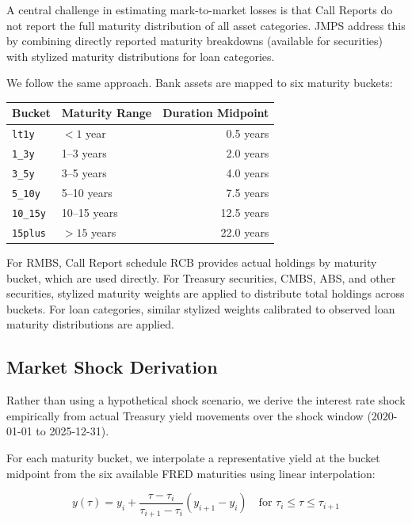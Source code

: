 \documentclass[12pt, a4paper]{article}
\begin{document}
A central challenge in estimating mark-to-market losses is that Call Reports do
not report the full maturity distribution of all asset categories. JMPS address
this by combining directly reported maturity breakdowns (available for securities)
with stylized maturity distributions for loan categories.

We follow the same approach. Bank assets are mapped to six maturity buckets:

\begin{center}
\begin{tabular}{llr}
\toprule
Bucket & Maturity Range & Duration Midpoint \\
\midrule
\texttt{lt1y}    & $< 1$ year      & 0.5 years  \\
\texttt{1\_3y}   & 1--3 years      & 2.0 years  \\
\texttt{3\_5y}   & 3--5 years      & 4.0 years  \\
\texttt{5\_10y}  & 5--10 years     & 7.5 years  \\
\texttt{10\_15y} & 10--15 years    & 12.5 years \\
\texttt{15plus}  & $> 15$ years    & 22.0 years \\
\bottomrule
\end{tabular}
\end{center}

For RMBS, Call Report schedule RCB provides actual holdings by maturity bucket,
which are used directly. For Treasury securities, CMBS, ABS, and other securities,
stylized maturity weights are applied to distribute total holdings across buckets.
For loan categories, similar stylized weights calibrated to observed loan maturity
distributions are applied.

\subsection{Market Shock Derivation}

Rather than using a hypothetical shock scenario, we derive the interest rate shock
empirically from actual Treasury yield movements over the shock window
(2020-01-01 to 2025-12-31).

For each maturity bucket, we interpolate a representative yield at the bucket
midpoint from the six available FRED maturities using linear interpolation:

\[
    y(\tau) = y_i + \frac{\tau - \tau_i}{\tau_{i+1} - \tau_i}(y_{i+1} - y_i)
    \quad \text{for } \tau_i \leq \tau \leq \tau_{i+1}
\]
\end{document}
